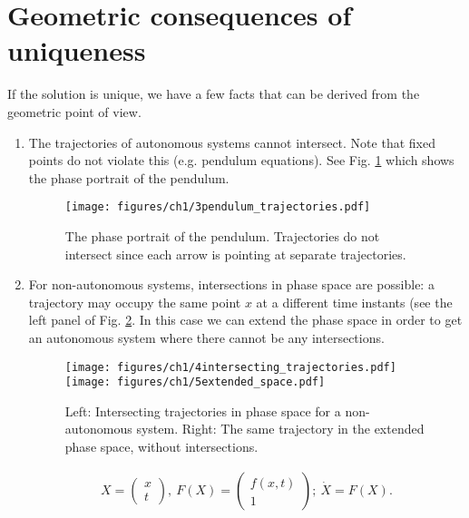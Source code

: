 \section{Geometric consequences of uniqueness}
If the solution is unique, we have a few facts that can be derived from the geometric point of view.
\begin{enumerate}
	\item The trajectories of autonomous systems cannot intersect. Note that fixed points do not violate this (e.g. pendulum equations). See Fig. \ref{fig:pend_phase_portrait} which shows the phase portrait of the pendulum.
		\begin{figure}[h!]
			\centering
			\texttt{[image: figures/ch1/3pendulum\_trajectories.pdf]}
			\caption{The phase portrait of the pendulum. Trajectories do not intersect since each arrow is pointing at separate trajectories.}
			\label{fig:pend_phase_portrait}
		\end{figure}
		
	\item For non-autonomous systems, intersections in phase space are possible: a trajectory may occupy the same point $x$ at a different time instants (see the left panel of Fig. \ref{fig:automization}. In this case we can extend the phase space in order to get an autonomous system where there cannot be any intersections.
		\begin{figure}[h!]
			\centering
			\texttt{[image: figures/ch1/4intersecting\_trajectories.pdf]}
			\hspace{0.05\textwidth}
			\texttt{[image: figures/ch1/5extended\_space.pdf]}
			\caption{Left: Intersecting trajectories in phase space for a non-autonomous system. Right: The same trajectory in the extended phase space, without intersections.}
			\label{fig:automization}
		\end{figure}
		\begin{align}
			 {X} = 
			\begin{pmatrix}
				 {x} \\ t
			\end{pmatrix},\
			F( {X}) = 
			\begin{pmatrix}
				f( {x},t) \\ 1
			\end{pmatrix};\
			\dot{ {X}} = F( {X}).
		\end{align}
\end{enumerate}

